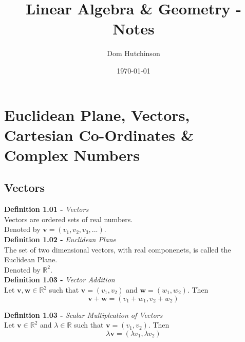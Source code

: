 \documentclass[11pt,a4paper]{article}
\begin{document}
\pagestyle{fancy}
\setlength\parindent{0pt}
\allowdisplaybreaks

\renewcommand{\headrulewidth}{0pt}
\newcommand{\vect}[1]{\boldsymbol{#1}}
\newcommand{\subtitle}[2]{\textbf{#1}\textit{#2} \\}
\newcommand{\dotprod}[0]{\boldsymbol{\cdot}}
\newcommand{\real}[0]{\mathbb{R}}
\newcommand{\nat}[0]{\mathbb{N}}
\newcommand{\field}[0]{\mathbb{F}}
\newcommand{\vectorspace}[0]{\mathbb{V}}
\newcommand{\basis}[0]{\mathbb{B}}
\newcommand{\complex}[0]{\mathbb{C}}

\title{Linear Algebra \& Geometry - Notes}
\author{Dom Hutchinson}
\date{\today}
\maketitle

\fancyhead[R]{\today}

\tableofcontents

\newpage

\section{Euclidean Plane, Vectors, Cartesian Co-Ordinates \& Complex Numbers}

\subsection{Vectors}

\subtitle{Definition 1.01 - }{Vectors}
Vectors are ordered sets of real numbers.\\
Denoted by $\vect{v} = (v_1, v_2, v_3,...)$.\\

\subtitle{Definition 1.02 - }{Euclidean Plane}
The set of two dimensional vectors, with real componenets, is called the Euclidean Plane. \\
Denoted by $\real^2$.\\

\subtitle{Definition 1.03 - }{Vector Addition}
Let $\vect{v}, \vect{w} \in \real^2$ such that $\vect{v} = (v_1,v_2)$ and $\vect{w} = (w_1,w_2)$. Then\\
$$\vect{v} + \vect{w} = (v_1 + w_1, v_2 + w_2)$$

\subtitle{Definition 1.03 - }{Scalar Multiplcation of Vectors}
Let $\vect{v} \in \real^2$ and $\lambda \in \real$ such that $\vect{v} = (v_1,v_2)$. Then\\
$$\lambda\vect{v} = (\lambda v_1, \lambda v_2)$$
\end{document}
